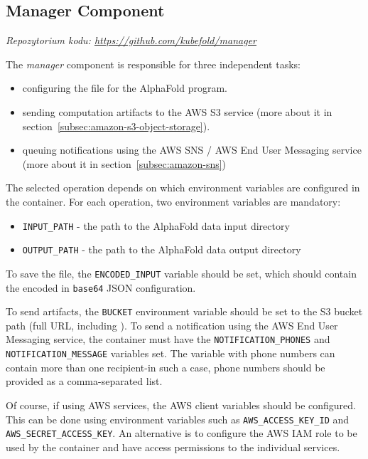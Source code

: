 \subsection{Manager Component}\label{subsec:component-manager}
\textit{Repozytorium kodu: \url{https://github.com/kubefold/manager}}

The \textit{manager} component is responsible for three independent tasks:
\begin{itemize}
    \item configuring the  file for the AlphaFold program.
    \item sending computation artifacts to the AWS S3 service (more about it in section~\ref{subsec:amazon-s3-object-storage}).
    \item queuing notifications using the AWS SNS / AWS End User Messaging service (more about it in section~\ref{subsec:amazon-sns})
\end{itemize}

The selected operation depends on which environment variables are configured in the container.
For each operation, two environment variables are mandatory:
\begin{itemize}
    \item \texttt{INPUT\_PATH} - the path to the AlphaFold data input directory
    \item \texttt{OUTPUT\_PATH} - the path to the AlphaFold data output directory
\end{itemize}

To save the  file, the \texttt{ENCODED\_INPUT} variable should be set, which should contain the encoded in \texttt{base64} JSON configuration.

To send artifacts, the \texttt{BUCKET} environment variable should be set to the S3 bucket path (full URL, including ).
To send a notification using the AWS End User Messaging service, the container must have the \texttt{NOTIFICATION\_PHONES} and \texttt{NOTIFICATION\_MESSAGE} variables set.
The variable with phone numbers can contain more than one recipient-in such a case, phone numbers should be provided as a comma-separated list.

Of course, if using AWS services, the AWS client variables should be configured.
This can be done using environment variables such as \texttt{AWS\_ACCESS\_KEY\_ID} and \texttt{AWS\_SECRET\_ACCESS\_KEY}.
An alternative is to configure the AWS IAM role to be used by the container and have access permissions to the individual services.